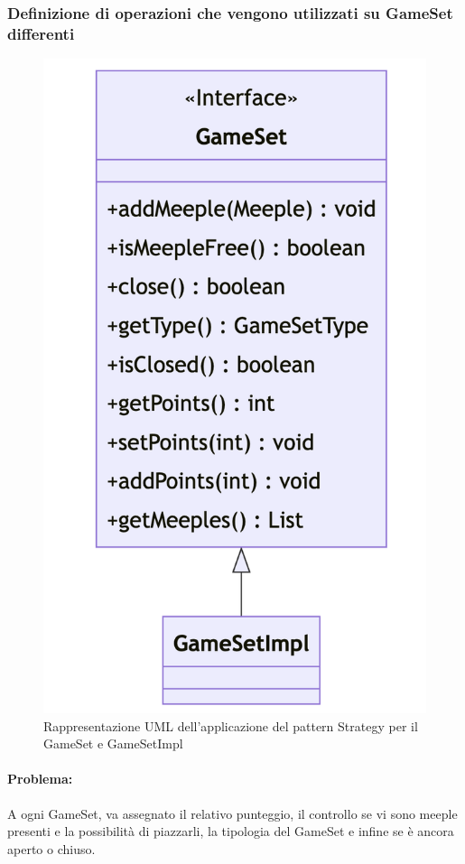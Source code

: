 \subsubsection*{Definizione di operazioni che vengono utilizzati su GameSet differenti}
\begin{figure}[h]
    \centering\includegraphics[scale=.4]{images/gameset.png}
    \caption{Rappresentazione UML dell'applicazione del pattern Strategy per il GameSet e GameSetImpl}
\end{figure}
\paragraph{Problema:}
A ogni GameSet, va assegnato il relativo punteggio, il controllo se vi sono meeple presenti e la possibilità di piazzarli, la tipologia del GameSet e infine se è ancora aperto o chiuso.
